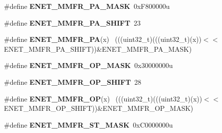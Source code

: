 \begin{DoxyCompactItemize}
\item 
\hypertarget{group___e_n_e_t___register___masks_ga94bdc2ca69bff166783ef7c044c025b4}{}\#define {\bfseries E\+N\+E\+T\+\_\+\+M\+M\+F\+R\+\_\+\+P\+A\+\_\+\+M\+A\+S\+K}~0x\+F800000u\label{group___e_n_e_t___register___masks_ga94bdc2ca69bff166783ef7c044c025b4}

\item 
\hypertarget{group___e_n_e_t___register___masks_gaf0551254f9579ac5acce7a3d8d22d808}{}\#define {\bfseries E\+N\+E\+T\+\_\+\+M\+M\+F\+R\+\_\+\+P\+A\+\_\+\+S\+H\+I\+F\+T}~23\label{group___e_n_e_t___register___masks_gaf0551254f9579ac5acce7a3d8d22d808}

\item 
\hypertarget{group___e_n_e_t___register___masks_ga2fdf434f10851af3b5be6ee8228d3d2f}{}\#define {\bfseries E\+N\+E\+T\+\_\+\+M\+M\+F\+R\+\_\+\+P\+A}(x)                                                ~(((uint32\+\_\+t)(((uint32\+\_\+t)(x))$<$$<$E\+N\+E\+T\+\_\+\+M\+M\+F\+R\+\_\+\+P\+A\+\_\+\+S\+H\+I\+F\+T))\&E\+N\+E\+T\+\_\+\+M\+M\+F\+R\+\_\+\+P\+A\+\_\+\+M\+A\+S\+K)\label{group___e_n_e_t___register___masks_ga2fdf434f10851af3b5be6ee8228d3d2f}

\item 
\hypertarget{group___e_n_e_t___register___masks_ga90049372c88bf3a759aecb3b9ab7208d}{}\#define {\bfseries E\+N\+E\+T\+\_\+\+M\+M\+F\+R\+\_\+\+O\+P\+\_\+\+M\+A\+S\+K}~0x30000000u\label{group___e_n_e_t___register___masks_ga90049372c88bf3a759aecb3b9ab7208d}

\item 
\hypertarget{group___e_n_e_t___register___masks_ga6c7887926bc9935d7fd783894fb4a34c}{}\#define {\bfseries E\+N\+E\+T\+\_\+\+M\+M\+F\+R\+\_\+\+O\+P\+\_\+\+S\+H\+I\+F\+T}~28\label{group___e_n_e_t___register___masks_ga6c7887926bc9935d7fd783894fb4a34c}

\item 
\hypertarget{group___e_n_e_t___register___masks_ga49d3ed74496defcd12d9b0f5444345c5}{}\#define {\bfseries E\+N\+E\+T\+\_\+\+M\+M\+F\+R\+\_\+\+O\+P}(x)                                                ~(((uint32\+\_\+t)(((uint32\+\_\+t)(x))$<$$<$E\+N\+E\+T\+\_\+\+M\+M\+F\+R\+\_\+\+O\+P\+\_\+\+S\+H\+I\+F\+T))\&E\+N\+E\+T\+\_\+\+M\+M\+F\+R\+\_\+\+O\+P\+\_\+\+M\+A\+S\+K)\label{group___e_n_e_t___register___masks_ga49d3ed74496defcd12d9b0f5444345c5}

\item 
\hypertarget{group___e_n_e_t___register___masks_ga98ea3eee6cc1ad4be4cd471b4adfd876}{}\#define {\bfseries E\+N\+E\+T\+\_\+\+M\+M\+F\+R\+\_\+\+S\+T\+\_\+\+M\+A\+S\+K}~0x\+C0000000u\label{group___e_n_e_t___register___masks_ga98ea3eee6cc1ad4be4cd471b4adfd876}


\end{DoxyCompactItemize}
